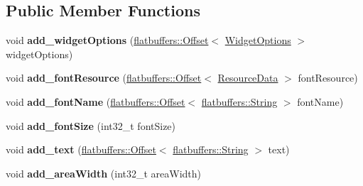 \subsection*{Public Member Functions}
\begin{DoxyCompactItemize}
\item 
\mbox{\label{structflatbuffers_1_1TextOptionsBuilder_ad27f9978574264da17735570224ceadd}} 
void {\bfseries add\+\_\+widget\+Options} (\hyperlink{structflatbuffers_1_1Offset}{flatbuffers\+::\+Offset}$<$ \hyperlink{structflatbuffers_1_1WidgetOptions}{Widget\+Options} $>$ widget\+Options)
\item 
\mbox{\label{structflatbuffers_1_1TextOptionsBuilder_a2e49df25d6624702efa3022fc8ca09fd}} 
void {\bfseries add\+\_\+font\+Resource} (\hyperlink{structflatbuffers_1_1Offset}{flatbuffers\+::\+Offset}$<$ \hyperlink{structflatbuffers_1_1ResourceData}{Resource\+Data} $>$ font\+Resource)
\item 
\mbox{\label{structflatbuffers_1_1TextOptionsBuilder_ac26639b895d0343880cd520fb3626404}} 
void {\bfseries add\+\_\+font\+Name} (\hyperlink{structflatbuffers_1_1Offset}{flatbuffers\+::\+Offset}$<$ \hyperlink{structflatbuffers_1_1String}{flatbuffers\+::\+String} $>$ font\+Name)
\item 
\mbox{\label{structflatbuffers_1_1TextOptionsBuilder_abc88e7d931727b43dc0b29a56b707944}} 
void {\bfseries add\+\_\+font\+Size} (int32\+\_\+t font\+Size)
\item 
\mbox{\label{structflatbuffers_1_1TextOptionsBuilder_a63da3563d7ce07503cbb0f06ba752f32}} 
void {\bfseries add\+\_\+text} (\hyperlink{structflatbuffers_1_1Offset}{flatbuffers\+::\+Offset}$<$ \hyperlink{structflatbuffers_1_1String}{flatbuffers\+::\+String} $>$ text)
\item 
\mbox{\label{structflatbuffers_1_1TextOptionsBuilder_aa061c13bd1bb2adcaa98bb568fce47a2}} 
void {\bfseries add\+\_\+area\+Width} (int32\+\_\+t area\+Width)
\item 
\mbox{\label{structflatbuffers_1_1TextOptionsBuilder_a961080d3c04e674656c875971318d87e}} 

\end{DoxyCompactItemize}
